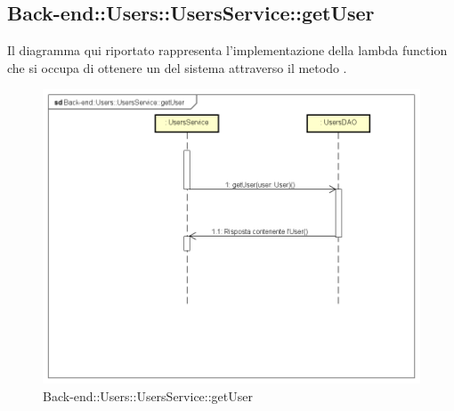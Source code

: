 \subsection{Back-end::Users::UsersService::getUser} 
Il diagramma qui riportato rappresenta l'implementazione della lambda function che si occupa di ottenere un  del sistema attraverso il metodo .  \begin{figure}[h] \centering \includegraphics[width=\textwidth,height=\textheight,keepaspectratio]{images/diagrams/back-end/Ufficial_Backend/Back-endUsersUsersServicegetUser.png} 	\caption{Back-end::Users::UsersService::getUser}
\end{figure} 
\newpage

